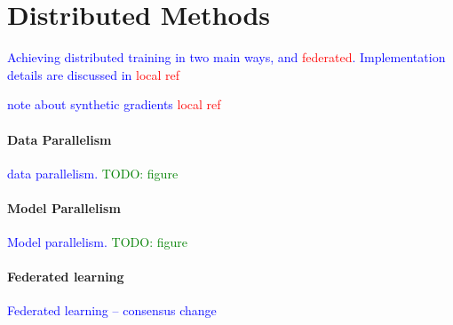 \chapter{Distributed Methods}

\textcolor{blue}{Achieving distributed training in two main ways, and \textcolor{red}{federated}. Implementation details are discussed in \textcolor{red}{local ref}}

\textcolor{blue}{note about synthetic gradients \textcolor{red}{local ref}}


\subsubsection{Data Parallelism}

\textcolor{blue}{data parallelism. \textcolor{green}{TODO: figure}}

\subsubsection{Model Parallelism}

\textcolor{blue}{Model parallelism. \textcolor{green}{TODO: figure}}

\subsubsection{Federated learning}

\textcolor{blue}{Federated learning -- consensus change}

